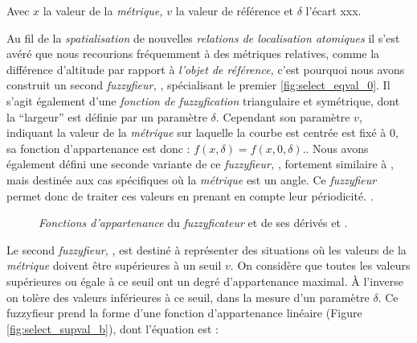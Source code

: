 Avec \(x\) la valeur de la \emph{métrique,} \(v\) la valeur de
référence et \(\delta\) l'écart xxx.

Au fil de la \emph{spatialisation} de nouvelles \emph{relations de
  localisation atomiques} il s'est avéré que nous recourions
fréquemment à des métriques relatives, comme la différence d'altitude
par rapport à \emph{l'objet de référence,} c'est pourquoi nous avons
construit un second \emph{fuzzyfieur,} , spécialisant le
premier \autoref{fig:select_eqval_0}. Il s'agit également d'une
\emph{fonction de fuzzyfication} triangulaire et symétrique, dont la
\enquote{largeur} est définie par un paramètre \(\delta\). Cependant
son paramètre \(v\), indiquant la valeur de la \emph{métrique} sur
laquelle la courbe est centrée est fixé à 0, sa fonction
d'appartenance est donc : \(f(x,\delta) = f(x,0,\delta)\).. Nous avons
également défini une seconde variante de ce \emph{fuzzyfieur,}
, fortement similaire à , mais destinée
aux cas spécifiques où la \emph{métrique} est un angle. Ce
\emph{fuzzyfieur} permet donc de traiter ces valeurs en prenant en
compte leur périodicité. .

\begin{figure}
  \centering
  
  \hfill  
  \caption{\emph{Fonctions d'appartenance} du \emph{fuzzyficateur}
    \protect{} et de ses dérivés \protect{}
    et \protect{}.}
  \label{fig:select_eqval}
\end{figure}

Le second \emph{fuzzyfieur,} , est destiné à
représenter des situations où les valeurs de la \emph{métrique}
doivent être supérieures à un seuil \(v\). On considère que toutes les
valeurs supérieures ou égale à ce seuil ont un degré d'appartenance
maximal. À l'inverse on tolère des valeurs inférieures à ce seuil,
dans la mesure d'un paramètre \(\delta\). Ce fuzzyfieur prend la forme
d'une fonction d'appartenance linéaire (Figure
\ref{fig:select_supval_b}), dont l'équation est :

